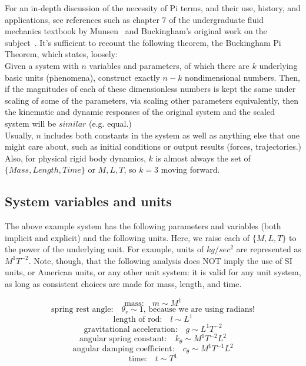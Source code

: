 \documentclass[12pt,letterpaper]{article}
\begin{document}
For an in-depth discussion of the necessity of Pi terms, and their use, history, and applications, see references such as chapter 7 of the undergraduate fluid mechanics textbook by Munsen~\cite{munson2013fundamentals} and Buckingham's original work on the subject~\cite{buckingham1914physically}.
It's sufficient to recount the following theorem, the Buckingham Pi Theorem, which states, loosely: \\


Given a system with $n$ variables and parameters, of which there are $k$ underlying basic units (phenomena), construct exactly $n-k$ nondimensional numbers.
Then, if the magnitudes of each of these dimensionless numbers is kept the same under scaling of some of the parameters, via scaling other parameters equivalently, then the kinematic and dynamic responses of the original system and the scaled system will be $similar$ (e.g. equal.) \\


Usually, $n$ includes both constants in the system as well as anything else that one might care about, such as initial conditions or output results (forces, trajectories.)
Also, for physical rigid body dynamics, $k$ is almost always the set of $\{Mass, Length, Time\}$ or $M, L, T$, so $k=3$ moving forward.

\subsection{System variables and units}

The above example system has the following parameters and variables (both implicit and explicit) and the following units.
Here, we raise each of $\{M,L,T\}$ to the power of the underlying unit.
For example, units of $kg / sec^2$ are represented as $M^1 T^{-2}$.
Note, though, that the following analysis does NOT imply the use of SI units, or American units, or any other unit system: it is valid for any unit system, as long as consistent choices are made for mass, length, and time.

\[
\text{mass:} \quad m \sim M^1
\]
\[
\text{spring rest angle:} \quad \theta_r \sim 1 \text{, because we are using radians!}
\]
\[
\text{length of rod:} \quad l \sim L^1
\]
\[
\text{gravitational acceleration:} \quad g \sim L^1 T^{-2}
\]
\[
\text{angular spring constant:} \quad k_{\theta} \sim M^1 T^{-2} L^2 
\]
\[
\text{angular damping coefficient:} \quad c_{\theta} \sim M^1 T^{-1} L^2
\]
\[
\text{time:} \quad t \sim T^1
\]
\end{document}
